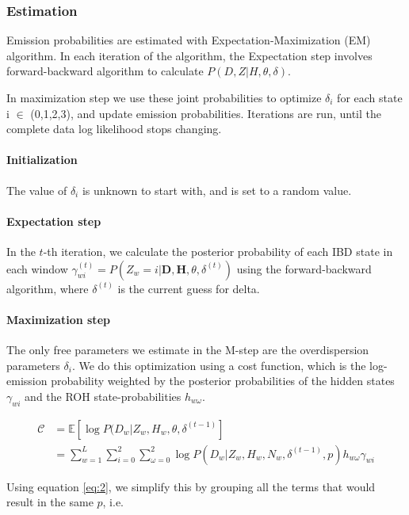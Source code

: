 \documentclass[12pt, letterpaper]{article}
\newcommand{\BD}{\mathbf{D}}
\newcommand{\BH}{\mathbf{H}}
\begin{document}
\subsubsection{Estimation}


Emission probabilities are estimated with Expectation-Maximization (EM) algorithm. In each iteration of the algorithm, the Expectation step involves forward-backward algorithm to calculate $P(D, Z| H, \theta, \delta)$. 



In maximization step we use these joint probabilities to optimize $\delta_i$ for each state i $\in$ (0,1,2,3), and update emission probabilities. Iterations are run, until the complete data log likelihood stops changing. 

\paragraph{Initialization}
The value of $\delta_i$ is unknown to start with, and is set to a random value.

\paragraph{Expectation step}
In the $t$-th iteration, we calculate the posterior probability of each IBD state in each window $\gamma^{(t)}_{wi} = P(Z_w=i | \BD, \BH, \theta, \delta^{(t)})$ using the forward-backward algorithm, where $\delta^{(t)}$ is the current guess for delta.

\paragraph{Maximization step}
The only free parameters we estimate in the M-step are the overdispersion parameters $\delta_i$. We do this optimization using a cost function, which is the log-emission probability weighted by the posterior probabilities of the hidden states $\gamma_{wi}$ and the ROH state-probabilities $h_{w\omega}$.


\begin{align}\label{eq:4}
\mathcal{C} &= \mathbb{E}[\log P(D_w|Z_w, H_w, \theta, \delta^{(t-1)}]\nonumber\\
&= \sum_{w=1}^L \sum_{i=0}^2\sum^2_{\omega=0} \log P(D_{w}|Z_w, H_w, N_w, \delta^{(t-1)}, p)h_{w\omega}\gamma_{wi}
\end{align}


Using equation \ref{eq:2}, we simplify this by grouping all the terms that would result in the same $p$, i.e.
\end{document}
